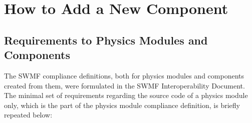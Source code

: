 

\chapter{How to Add a New Component}

\section{Requirements to Physics Modules and Components}

The SWMF compliance definitions, both for physics modules and components 
created from them, were formulated in the SWMF Interoperability Document. 
The minimal set of requirements regarding the source code of a physics 
module only, which is the part of the physics module compliance definition, 
is briefly repeated below:


